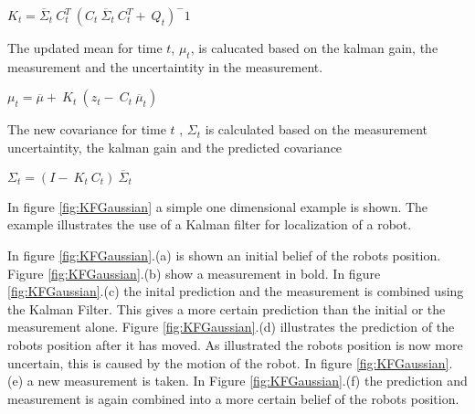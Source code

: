 \begin{center}
$K_t = \overline{\Sigma}_t \ C^T_t \ (C_t \ \overline{\Sigma}_t \ C^T_t +\ Q_t )^-1$ \\
\end{center}	

The updated mean for time $t$, $\mu_t$, is calucated based on the kalman gain, the measurement and the uncertaintity in the measurement.

\begin{center}
	$\mu_t =  \overline{\mu} + \ K_t \ (z_t- \ C_t \ \overline{\mu}_t)$ \\
\end{center}

The new covariance for time $t$ , $\Sigma_t$ is calculated based on the measurement uncertaintity, the kalman gain and the predicted covariance
\begin{center}
$\Sigma_t = (I - \ K_t \ C_t) \ \overline{\Sigma}_t$ \\
\end{center}


In figure \ref{fig:KFGaussian} a simple one dimensional example is shown. The example illustrates the use of a Kalman filter for localization of a robot. 

In figure \ref{fig:KFGaussian}.(a) is shown an initial belief of the robots position. Figure \ref{fig:KFGaussian}.(b) show a measurement in bold. In figure \ref{fig:KFGaussian}.(c) the inital prediction and the measurement is combined using the Kalman Filter. This gives a more certain prediction than the initial or the measurement alone. Figure \ref{fig:KFGaussian}.(d) illustrates the prediction of the robots position after it has moved. As illustrated the robots position is now more uncertain, this is caused by the motion of the robot. In figure \ref{fig:KFGaussian}.(e) a new measurement is taken. In Figure \ref{fig:KFGaussian}.(f) the prediction and measurement is again combined into a more certain belief of the robots position.

